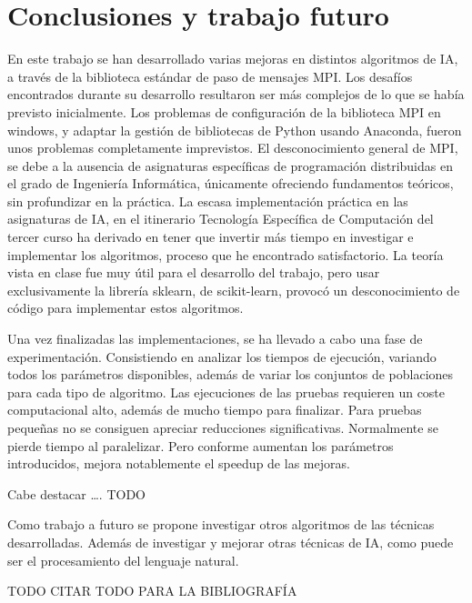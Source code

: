 \chapter{Conclusiones y trabajo futuro}
	
	En este trabajo se han desarrollado varias mejoras en distintos algoritmos de IA, a través de la biblioteca estándar de paso de mensajes MPI.
	Los desafíos encontrados durante su desarrollo resultaron ser más complejos de lo que se había previsto inicialmente. Los problemas de configuración de la biblioteca MPI en windows, y adaptar la gestión de bibliotecas de Python usando Anaconda, fueron unos problemas completamente imprevistos. El desconocimiento general de  MPI, se debe a la ausencia de asignaturas específicas de programación distribuidas en el grado de Ingeniería Informática, únicamente ofreciendo fundamentos teóricos, sin profundizar en la práctica. 
	La escasa implementación práctica en las asignaturas de IA, en el itinerario Tecnología Específica de Computación del tercer curso ha derivado en tener que invertir más tiempo en investigar e implementar los algoritmos, proceso que he encontrado satisfactorio. La teoría vista en clase fue muy útil para el desarrollo del trabajo, pero usar exclusivamente la librería sklearn, de scikit-learn, provocó un desconocimiento de código para implementar estos algoritmos.
	
	Una vez finalizadas las implementaciones, se ha llevado a cabo una fase de experimentación. Consistiendo en analizar los tiempos de ejecución, variando todos los parámetros disponibles, además de variar los conjuntos de poblaciones para cada tipo de algoritmo.
	Las ejecuciones de las pruebas requieren un coste computacional alto, además de mucho tiempo para finalizar. Para pruebas pequeñas no se consiguen apreciar reducciones significativas. Normalmente se pierde tiempo al paralelizar. Pero conforme aumentan los parámetros introducidos, mejora notablemente el speedup de las mejoras.
	
	\color{blue} Cabe destacar …. TODO \color{black}%
	
	
	
	Como trabajo a futuro se propone investigar otros algoritmos de las técnicas desarrolladas. Además de investigar y mejorar otras técnicas de IA, como puede ser el procesamiento del lenguaje natural.
	
	
	
	\huge \color{blue} TODO CITAR TODO PARA LA BIBLIOGRAFÍA
	\color{black}
	\normalsize
	
	